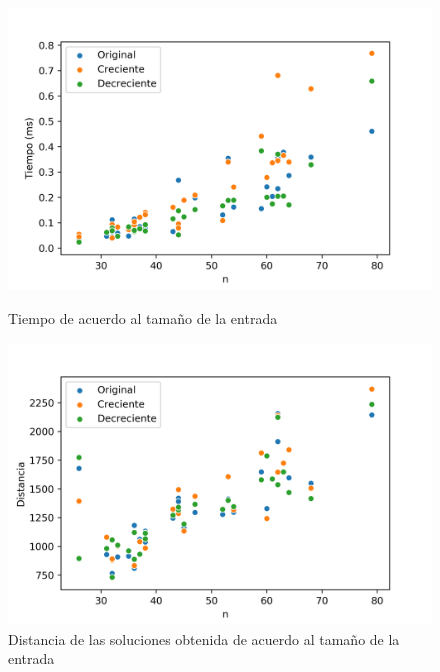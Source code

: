 \begin{figure}[H]
	\centering
	\begin{minipage}{0.44\textwidth}
		\centering
		\includegraphics[width=1\textwidth]{images/kmeans/expsortingtiempo}
		\caption{\footnotesize Tiempo de acuerdo al tamaño de la entrada}
		\label{fig:kmeans-sort-tiempo}
	\end{minipage}%
	\hspace{0.03\textwidth}
	\begin{minipage}{0.44\textwidth}
		\centering
		\includegraphics[width=1\textwidth]{images/kmeans/expsorting}
		\caption{\footnotesize Distancia de las soluciones obtenida de acuerdo al tamaño de la entrada}
		\label{fig:kmeans-sort-distancia}
	\end{minipage}%
\end{figure}
